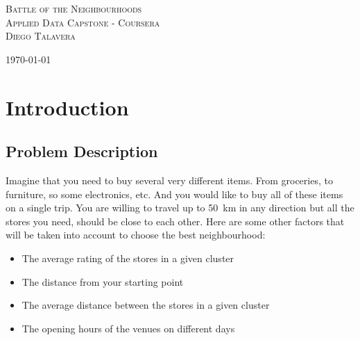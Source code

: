 \documentclass{article}
\begin{document}
	
	\begin{titlepage}
		\center
		\newcommand{\HRule}{\rule{\linewidth}{0.5mm}}
			\textsc{\Huge Battle of the Neighbourhoods}\\[1.5cm]
			\textsc{\LARGE Applied Data Capstone - Coursera}\\[0.3cm]
			\textsc{\large Diego Talavera}\\[0.5cm]
		
			\vfill\vfill\vfill %
			
			{\large\today} %
	\end{titlepage}
	
	
	\newpage				%
	\renewcommand{\contentsname}{Table of Contents}
	\tableofcontents		%
	
	
	\newpage
	\section{Introduction}
	\subsection{Problem Description}
		Imagine that you need to buy several very different items. From groceries, to furniture, so some electronics, etc. And you would like to buy all of these items on a single trip. You are willing to travel up to \SI{50}{\kilo\meter} in any direction but all the stores you need, should be close to each other. Here are some other factors that will be taken into account to choose the best neighbourhood: 
		\begin{itemize}
			\item The average rating of the stores in a given cluster
			\item The distance from your starting point
			\item The average distance between the stores in a given cluster
			\item The opening hours of the venues on different days
		\end{itemize}
		
\end{document}
